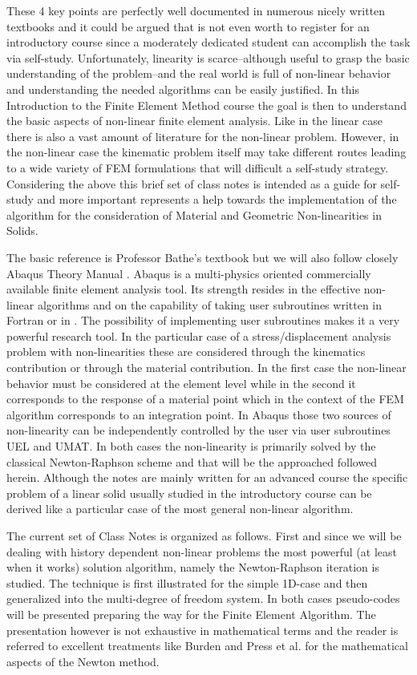 These 4 key points are perfectly well documented in numerous nicely written textbooks and it could be argued that is not even worth to register for an introductory course since a moderately dedicated student can accomplish the task via self-study. Unfortunately, linearity is scarce--although useful to grasp the basic understanding of the problem--and the real world is full of non-linear behavior and understanding the needed algorithms can be easily justified. In this Introduction to the Finite Element Method course the goal is then to understand the basic aspects of non-linear finite element analysis.  Like in the linear case there is also a vast amount of literature for the non-linear problem.  However, in the non-linear case the kinematic problem itself may take different routes leading to a wide variety of FEM formulations that will difficult a self-study strategy.  Considering the above this brief set of class notes is intended as a guide for self-study and more important represents a help towards the implementation of the algorithm for the consideration of Material and Geometric Non-linearities in Solids.

The basic reference is Professor Bathe's textbook \cite{book:bathe} but we will also follow closely Abaqus Theory Manual \cite{abaqus_theory}. Abaqus is a multi-physics oriented commercially available finite element analysis tool. Its strength resides in the effective non-linear algorithms and on the capability of taking user subroutines written in Fortran or in \CPP.  The possibility of implementing user subroutines makes it a very powerful research tool.  In the particular case of a stress/displacement analysis problem with non-linearities these are considered through the kinematics contribution or through the material contribution.  In the first case the non-linear behavior must be considered at the element level while in the second it corresponds to the response of a material point which in the context of the FEM algorithm corresponds to an integration point. In Abaqus those two sources of non-linearity can be independently controlled by the user via user subroutines UEL and UMAT.  In both cases the non-linearity is primarily solved by the classical Newton-Raphson scheme and that will be the approached followed herein.  Although the notes are mainly written for an advanced course the specific problem of a linear solid usually studied in the introductory course can be derived like a particular case of the most general non-linear algorithm.

The current set of Class Notes is organized as follows.  First and since we will be dealing with history dependent non-linear problems the most powerful (at least when it works) solution algorithm, namely the Newton-Raphson iteration is studied.  The technique is first illustrated for the simple 1D-case and then generalized into the multi-degree of freedom system.  In both cases pseudo-codes will be presented preparing the way for the Finite Element Algorithm.  The presentation however is not exhaustive in mathematical terms and the reader is referred to excellent treatments like Burden \cite{book:burden2011} and Press et al. \cite{book:numerical_recipes} for the mathematical aspects of the Newton method.

